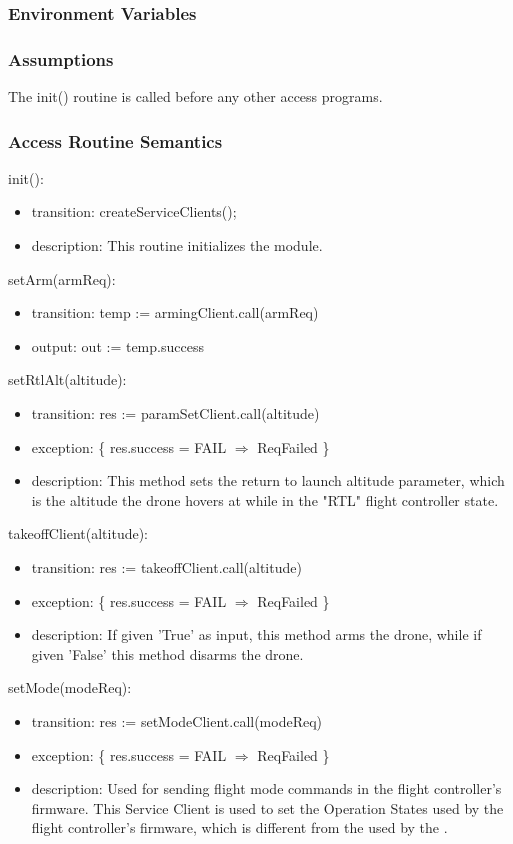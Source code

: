 \documentclass[12pt, titlepage]{article}
\begin{document}
\subsubsection{Environment Variables}
\subsubsection{Assumptions}
The init() routine is called before any other access programs.
\subsubsection{Access Routine Semantics}
\noindent init():
\begin{itemize}
\item transition: createServiceClients();
\item description: This routine initializes the module. 
\end{itemize}
\noindent setArm(armReq):
\begin{itemize}
\item transition: temp := armingClient.call(armReq)
\item output: out := temp.success
\end{itemize}
\noindent setRtlAlt(altitude):
\begin{itemize}
\item transition: res := paramSetClient.call(altitude)
\item exception: \{ res.success = FAIL $\Rightarrow$ ReqFailed \}
\item description: This method sets the return to launch altitude parameter, which is the altitude the drone hovers at while in the "RTL" flight controller state.
\end{itemize}
\noindent takeoffClient(altitude):
\begin{itemize}
\item transition: res := takeoffClient.call(altitude)
\item exception: \{ res.success = FAIL $\Rightarrow$ ReqFailed \}
\item description: If given 'True' as input, this method arms the drone, while if given 'False' this method disarms the drone.
\end{itemize}
\noindent setMode(modeReq):
\begin{itemize}
\item transition: res := setModeClient.call(modeReq)
\item exception: \{ res.success = FAIL $\Rightarrow$ ReqFailed \}
\item description: Used for sending flight mode commands in the flight controller's firmware. This Service Client is used to set the Operation States used by the flight controller's firmware, which is different from the  used by the . 
\end{itemize}
\end{document}
